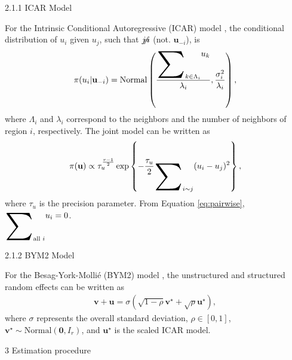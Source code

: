 \documentclass[12pt]{beamer}
\begin{document}
\begin{frame}[t]
\begin{columns}[t]
\begin{column}{0.30\textwidth}
			{\textcolor{title-fg}{2.1.1 ICAR Model}} \vspace{18pt}
			
			For the Intrinsic Conditional Autoregressive (ICAR) model \citep{besag:1974}, the conditional distribution of $u_i$ given $u_j$, such that $j\hspace{-6pt}\neq\hspace{-6pt}i$ (not. $\mathbf{u}_{-i}$), is
			\begin{align*} 
				\pi(u_i | \mathbf{u}_{-i}) = \text{Normal}\left(\frac{\displaystyle\raisebox{-18pt}{\scalebox{3.2}{\ensuremath{\sum}}}_{k \in \Lambda_{i}} u_k}{\lambda_{i}}, \frac{\sigma_i^2}{\lambda_i}\right),
			\end{align*}
			where $\Lambda_i$ and $\lambda_i$ correspond to the neighbors and the number of neighbors of region $i$, \hspace{-6pt}respectively.\hspace{-6pt} The joint model can be written as
			\begin{align} \label{eq:pairwise}
				\pi(\mathbf{u}) \propto \tau_u^{\frac{r - 1}{2}}\exp\left\{-\frac{\tau_u}{2}\displaystyle\raisebox{-18pt}{\scalebox{3.2}{\ensuremath{\sum}}}_{i \sim j} (u_i - u_j) ^ 2\right\},
			\end{align}
			where $\tau_u$ is the precision parameter. From Equation \eqref{eq:pairwise}, $\displaystyle\raisebox{-18pt}{\scalebox{3.2}{\ensuremath{\sum}}}_{\text{all } i} u_i = 0$.
			
			\vspace{18pt}
						
			{\textcolor{title-fg}{2.1.2 BYM2 Model}} \vspace{18pt}
			
			For the Besag-York-Mollié (BYM2) model \citep{besag:1991}, the unstructured and structured random effects can be written as
			\begin{align*} 
				\mathbf{v} + \mathbf{u} = \sigma(\sqrt{1 - \rho} \mathbf{v}^{\star} + \sqrt{\rho}\mathbf{u}^{\star}),
			\end{align*}
			where $\sigma$ represents the overall standard deviation, $\rho \in [0, 1]$, $\mathbf{v}^{\star} \sim \text{Normal}(\mathbf{0}, I_r)$, and $\mathbf{u}^{\star}$ is the scaled ICAR model.
			
			\vspace{18pt}
			
			\begin{block}{\Large 3 Estimation procedure} \justifying \vspace{12pt}				
				

\end{block}
\end{column}
\end{columns}
\end{frame}
\end{document}
